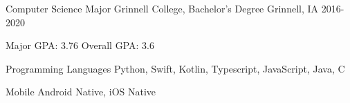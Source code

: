 \documentclass[11pt, a4paper]{awesome-cv}
\begin{document}
\begin{cventries}


\end{cventries}


\begin{cventries}
  \cventry
    {Computer Science Major}
    {Grinnell College, Bachelor's Degree}
    {Grinnell, IA}
    {2016-2020}
    {
      \begin{cvitems}
        \item {Major GPA: 3.76 \quad Overall GPA: 3.6}
      \end{cvitems}
    }
\end{cventries}


\begin{cvskills}
  \cvskill
    {Programming Languages} 
    {Python, Swift, Kotlin, Typescript, JavaScript, Java, C} 


  \cvskill
    {Mobile}
    {Android Native, iOS Native}

\end{cvskills}


%
%
\end{document}
